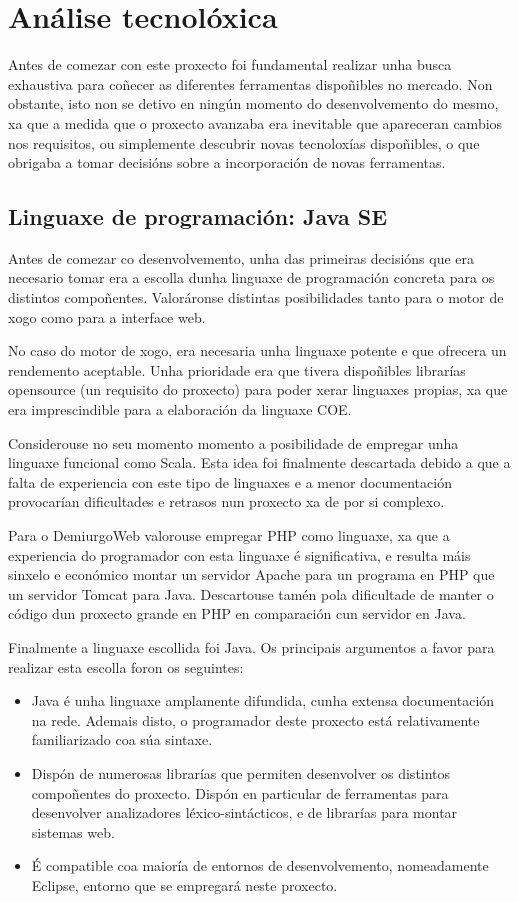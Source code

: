 \section{Análise tecnolóxica}
Antes de comezar con este proxecto foi fundamental realizar unha busca
exhaustiva para coñecer as diferentes ferramentas dispoñibles no mercado. Non
obstante, isto non se detivo en ningún momento do desenvolvemento do mesmo, xa
que a medida que o proxecto avanzaba era inevitable que apareceran cambios nos
requisitos, ou simplemente descubrir novas tecnoloxías dispoñibles, o que
obrigaba a tomar decisións sobre a incorporación de novas ferramentas.

\subsection{Linguaxe de programación: Java SE}
Antes de comezar co desenvolvemento, unha das primeiras decisións que era
necesario tomar era a escolla dunha linguaxe de programación concreta para os
distintos compoñentes. Valoráronse distintas posibilidades tanto para o motor de
xogo como para a interface web.
\par
No caso do motor de xogo, era necesaria unha linguaxe potente e que ofrecera un
rendemento aceptable. Unha prioridade era que tivera dispoñibles librarías
opensource (un requisito do proxecto) para poder xerar linguaxes propias, xa que
era imprescindible para a elaboración da linguaxe COE.
\par
Considerouse no seu momento momento a posibilidade de empregar unha linguaxe
funcional como Scala. Esta idea foi finalmente descartada debido a que a falta
de experiencia con este tipo de linguaxes e a menor documentación provocarían
dificultades e retrasos nun proxecto xa de por si complexo.
\par
Para o DemiurgoWeb valorouse empregar PHP como linguaxe, xa que a experiencia do
programador con esta linguaxe é significativa, e resulta máis sinxelo e
económico montar un servidor Apache para un programa en PHP que un servidor
Tomcat para Java.
Descartouse tamén pola dificultade de manter o código dun proxecto grande en PHP
en comparación cun servidor en Java.
\par
Finalmente a linguaxe escollida foi Java\cite{java}. Os principais argumentos a
favor para realizar esta escolla foron os seguintes:
\begin{itemize}
  \item Java é unha linguaxe amplamente difundida, cunha extensa documentación
  na rede. Ademais disto, o programador deste proxecto está relativamente
  familiarizado coa súa sintaxe.
  \item Dispón de numerosas librarías que permiten desenvolver os distintos
  compoñentes do proxecto. Dispón en particular de ferramentas para desenvolver
  analizadores léxico-sintácticos, e de librarías para montar sistemas web.
  \item É compatible coa maioría de entornos de desenvolvemento, nomeadamente
  Eclipse, entorno que se empregará neste proxecto.
\end{itemize}

